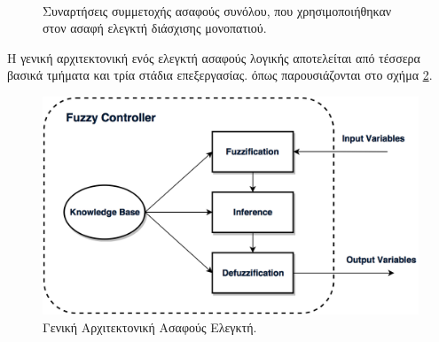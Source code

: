 \begin{figure}
	\centering
	\\[-0.25cm]
	\caption{Συναρτήσεις συμμετοχής ασαφούς συνόλου, που χρησιμοποιήθηκαν στον ασαφή ελεγκτή διάσχισης μονοπατιού.}
	\label{fig:membership_functions}
\end{figure}

\bigskip
Η γενική αρχιτεκτονική ενός ελεγκτή ασαφούς λογικής αποτελείται από τέσσερα βασικά τμήματα και τρία στάδια επεξεργασίας. όπως παρουσιάζονται στο σχήμα \ref{fig:fuzzy_controller_architecture}.

\begin{figure}[!ht]
	\centering
	\includegraphics[width=0.6\linewidth]{Chapters/Chapter3/Figures/fuzzy_controller_architecture.png}
	\caption{Γενική Αρχιτεκτονική Ασαφούς Ελεγκτή.}
	\label{fig:fuzzy_controller_architecture}
\end{figure}

